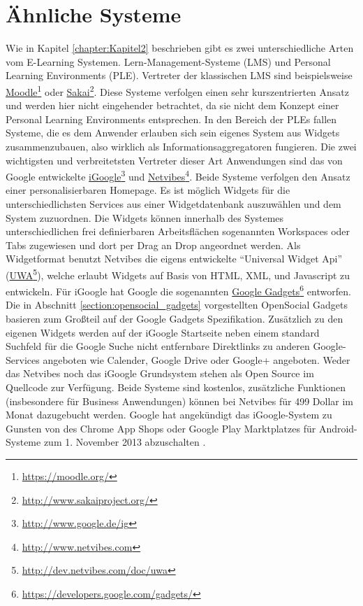 \section{Ähnliche Systeme}\label{section:aehnliche_systeme}
Wie in Kapitel \ref{chapter:Kapitel2} beschrieben gibt es zwei unterschiedliche Arten vom E-Learning Systemen. Lern-Management-Systeme (LMS) und Personal Learning Environments (PLE). Vertreter der klassischen LMS sind beispielsweise \href{https://moodle.org/}{Moodle}\footnote{\url{https://moodle.org/}} oder \href{http://www.sakaiproject.org/}{Sakai}\footnote{\url{http://www.sakaiproject.org/}}. Diese Systeme verfolgen einen sehr kurszentrierten Ansatz und werden hier nicht eingehender betrachtet, da sie nicht dem Konzept einer Personal Learning Environments entsprechen. In den Bereich der PLEs fallen Systeme, die es dem Anwender erlauben sich sein eigenes System aus Widgets zusammenzubauen, also wirklich als Informationsaggregatoren fungieren. Die zwei wichtigsten und verbreitetsten Vertreter dieser Art Anwendungen sind das von Google entwickelte \href{http://www.google.de/ig}{iGoogle}\footnote{\url{http://www.google.de/ig}} und \href{http://www.netvibes.com}{Netvibes}\footnote{\url{http://www.netvibes.com}}. Beide Systeme verfolgen den Ansatz einer personalisierbaren Homepage. Es ist möglich Widgets für die unterschiedlichsten Services aus einer Widgetdatenbank auszuwählen und dem System zuzuordnen. Die Widgets können innerhalb des Systemes unterschiedlichen frei definierbaren Arbeitsflächen sogenannten Workspaces oder Tabs zugewiesen und dort per Drag an Drop angeordnet werden. Als Widgetformat benutzt Netvibes die eigens entwickelte "`Universal Widget Api"' (\href{http://dev.netvibes.com/doc/uwa}{UWA}\footnote{\url{http://dev.netvibes.com/doc/uwa}}), welche erlaubt Widgets auf Basis von HTML, XML, und Javascript zu entwickeln. Für iGoogle hat Google die sogenannten \href{https://developers.google.com/gadgets/}{Google Gadgets}\footnote{\url{https://developers.google.com/gadgets/}} entworfen. Die in Abschnitt \ref{section:opensocial_gadgets} vorgestellten OpenSocial Gadgets basieren zum Großteil auf der Google Gadgets Spezifikation. Zusätzlich zu den eigenen Widgets werden auf der iGoogle Startseite neben einem standard Suchfeld für die Google Suche nicht entfernbare Direktlinks zu anderen Google-Services angeboten wie Calender, Google Drive oder Google+ angeboten. Weder das Netvibes noch das iGoogle Grundsystem stehen als Open Source im Quellcode zur Verfügung. Beide Systeme sind kostenlos, zusätzliche Funktionen (insbesondere für Business Anwendungen) können bei Netvibes für 499 Dollar im Monat dazugebucht werden. Google hat angekündigt das iGoogle-System zu Gunsten von des Chrome App Shops oder Google Play Marktplatzes für Android-Systeme zum 1. November 2013 abzuschalten \cite{Google2012}.

